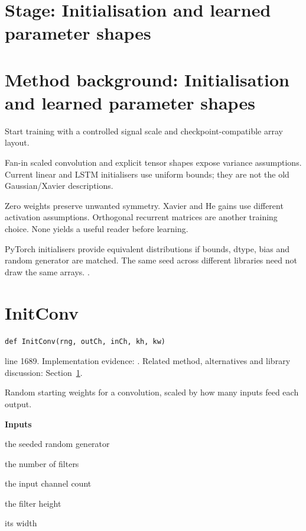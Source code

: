 \section*{Stage: Initialisation and learned parameter shapes}
\section{Method background: Initialisation and learned parameter shapes}\label{method:init}
Start training with a controlled signal scale and checkpoint-compatible array layout.


Fan-in scaled convolution and explicit tensor shapes expose variance assumptions. Current linear and LSTM initialisers use uniform bounds; they are not the old Gaussian/Xavier descriptions.


Zero weights preserve unwanted symmetry. Xavier and He gains use different activation assumptions. Orthogonal recurrent matrices are another training choice. None yields a useful reader before learning.


PyTorch initialisers provide equivalent distributions if bounds, dtype, bias and random generator are matched. The same seed across different libraries need not draw the same arrays. \cite{he2015,glorot2010,torchlstm,torchlinear}.


\section{InitConv}\label{fn:train:InitConv}
\begin{lstlisting}[style=sig]
def InitConv(rng, outCh, inCh, kh, kw)
\end{lstlisting}
 line 1689. Implementation evidence: \cite{code2026}. Related method, alternatives and library discussion: Section~\ref{method:init}.


Random starting weights for a convolution, scaled by how many inputs feed each output.




\noindent\textbf{Inputs}
\begin{description}[leftmargin=2.2em,style=nextline,font=\normalfont\ttfamily]\setlength\itemsep{1pt}
  \item[{rng}] \normalfont the seeded random generator
  \item[{outCh}] \normalfont the number of filters
  \item[{inCh}] \normalfont the input channel count
  \item[{kh}] \normalfont the filter height
  \item[{kw}] \normalfont its width
\end{description}

